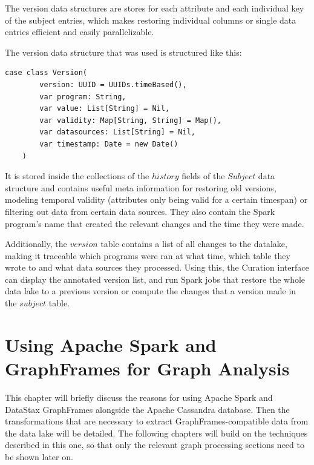\documentclass[
        a4paper,     %
        titlepage,   %
        oneside,     %
        parskip      %
        ]{scrartcl}  %
\begin{document}
    The version data structures are stores for each attribute and each individual
    key of the subject entries, which makes restoring individual columns or single
    data entries efficient and easily parallelizable.

    The version data structure that was used is structured like this:
    \begin{lstlisting}[style=scalaStyle,caption=Version]
    case class Version(
    	version: UUID = UUIDs.timeBased(),
    	var program: String,
    	var value: List[String] = Nil,
    	var validity: Map[String, String] = Map(),
    	var datasources: List[String] = Nil,
    	var timestamp: Date = new Date()
    )
    \end{lstlisting}

    It is stored inside the collections of the $history$ fields of the $Subject$
    data structure and contains useful meta information for restoring old versions,
    modeling temporal validity (attributes only being valid for a certain timespan)
    or filtering out data from certain data sources. They also contain the Spark
    program's name that created the relevant changes and the time they were made.

    Additionally, the $version$ table contains a list of all changes to the datalake,
    making it traceable which programs were ran at what time, which table they wrote
    to and what data sources they processed. Using this, the Curation interface
    can display the annotated version list, and run Spark jobs that restore the
    whole data lake to a previous version or compute the changes that a version
    made in the $subject$ table.
    \pagebreak

  \section{Using Apache Spark and GraphFrames for Graph Analysis}
  This chapter will briefly discuss the reasons for using Apache Spark and DataStax GraphFrames
  alongside the Apache Cassandra database. Then the transformations that are
  necessary to extract GraphFrames-compatible data from the data lake will be detailed.
  The following chapters will build on the techniques described in this one, so
  that only the relevant graph processing sections need to be shown later on.
\end{document}
